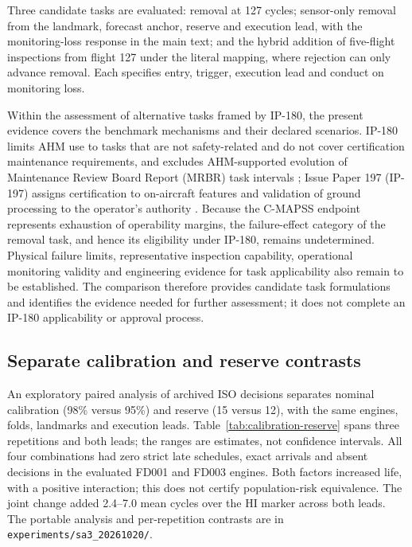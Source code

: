 \documentclass[12pt]{article}
\begin{document}
Three candidate tasks are evaluated: removal at 127 cycles; sensor-only removal from the landmark, forecast anchor, reserve and execution lead, with the monitoring-loss response in the main text; and the hybrid addition of five-flight inspections from flight 127 under the literal mapping, where rejection can only advance removal. Each specifies entry, trigger, execution lead and conduct on monitoring loss.

Within the assessment of alternative tasks framed by IP-180, the present evidence covers the benchmark mechanisms and their declared scenarios. IP-180 limits AHM use to tasks that are not safety-related and do not cover certification maintenance requirements, and excludes AHM-supported evolution of Maintenance Review Board Report (MRBR) task intervals \cite{IP180}; Issue Paper 197 (IP-197) assigns certification to on-aircraft features and validation of ground processing to the operator's authority \cite{IP197}. Because the C-MAPSS endpoint represents exhaustion of operability margins, the failure-effect category of the removal task, and hence its eligibility under IP-180, remains undetermined. Physical failure limits, representative inspection capability, operational monitoring validity and engineering evidence for task applicability also remain to be established. The comparison therefore provides candidate task formulations and identifies the evidence needed for further assessment; it does not complete an IP-180 applicability or approval process.


\subsection*{Separate calibration and reserve contrasts}
An exploratory paired analysis of archived ISO decisions separates nominal calibration
(98\% versus 95\%) and reserve (15 versus 12), with the same engines, folds,
landmarks and execution leads. Table~\ref{tab:calibration-reserve} spans three
repetitions and both leads; the ranges are estimates, not confidence intervals.
All four combinations had zero strict late schedules, exact arrivals and absent
decisions in the evaluated FD001 and FD003 engines. Both factors increased life,
with a positive interaction; this does not certify population-risk equivalence.
The joint change added 2.4--7.0 mean cycles over the HI marker across both leads.
The portable analysis and per-repetition contrasts are in
\texttt{experiments/sa3\_20261020/}.
\end{document}

